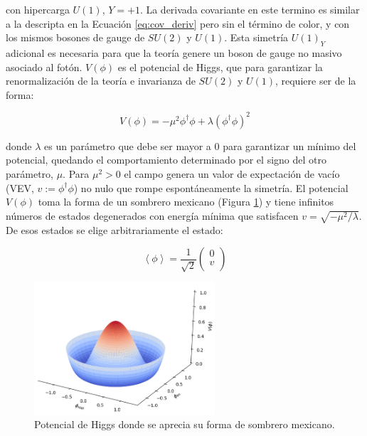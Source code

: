 \noindent
con hipercarga $U(1)$, $Y=+1$. La derivada covariante en este termino es similar a la descripta en la Ecuación \ref{eq:cov_deriv} pero sin el término de color, y con los mismos bosones de gauge de $SU(2)$ y $U(1)$. Esta simetría $U(1)_Y$ adicional es necesaria para que la teoría genere un boson de gauge no masivo asociado al fotón.
$V(\phi)$ es el potencial de Higgs, que para garantizar la renormalización de la teoría e invarianza de $SU(2)$ y $U(1)$, requiere ser de la forma:

\begin{equation}
	V(\phi) = - \mu^{2}\phi^{\dagger}\phi + \lambda(\phi^{\dagger}\phi)^{2}
	\label{eq:higgs_pot}
\end{equation}

\noindent
donde $\lambda$ es un parámetro que debe ser mayor a $0$ para garantizar un mínimo del potencial, quedando el comportamiento determinado por el signo del otro parámetro, $\mu$. Para $\mu^2>0$ el campo genera un valor de expectación de vacío (VEV, $v:=\phi^{\dagger}\phi$) no nulo que rompe espontáneamente la simetría. El potencial $V(\phi)$ toma la forma de un sombrero mexicano (Figura \ref{fig:mexican_hat}) y tiene infinitos números de estados degenerados con energía mínima que satisfacen $v = \sqrt{-\mu^2/\lambda}$. De esos estados se elige arbitrariamente el estado:

\begin{equation}
	\left<\phi\right> = \frac{1}{\sqrt{2}}
	\begin{pmatrix}
	0 \\
	v \\
	\end{pmatrix}
\end{equation}

\begin{figure}
  \centering
  \includegraphics[width=0.6\textwidth]{images/theory/mexican_hat.png}
  \caption{Potencial de Higgs donde se aprecia su forma de sombrero mexicano.}
  \label{fig:mexican_hat}
\end{figure}

